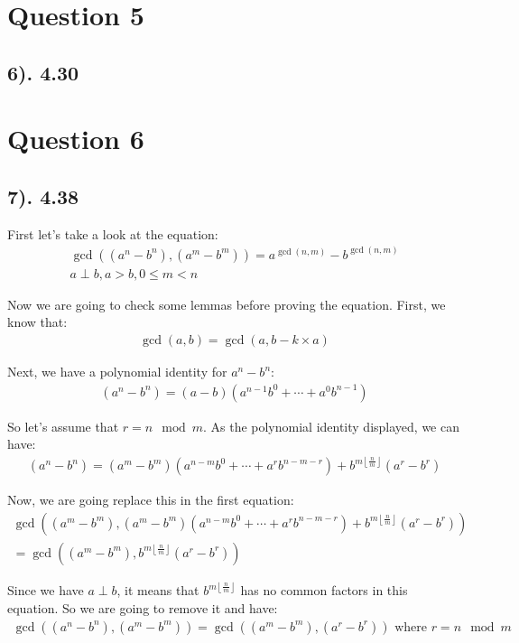 \documentclass[12pt]{article}
\begin{document}
\section*{Question 5}
\subsection*{6). 4.30}

\section*{Question 6}
\subsection*{7). 4.38}
First let's take a look at the equation:
\begin{gather*}
    \gcd((a^n - b^n), (a^m - b^m)) = a^{\gcd(n,m)} - b^{\gcd(n,m)} \\
    a \perp b, a > b, 0 \leq m < n
\end{gather*}

Now we are going to check some lemmas before proving the equation. First, we know that:
\begin{gather*}
    \gcd(a, b) = \gcd(a, b - k \times a)
\end{gather*}

Next, we have a polynomial identity for $a^n - b^n$:
\begin{gather*}
    (a^n - b^n) = (a - b)(a^{n-1}b^0 + \cdots + a^0b^{n-1})
\end{gather*}

So let's assume that $r = n \mod m$. As the polynomial identity displayed, we can have:
\begin{gather*}
    (a^n - b^n) = (a^m - b^m)(a^{n-m}b^0 + \cdots + a^r b^{n-m-r}) + b^{m \left\lfloor \frac{n}{m} \right\rfloor} (a^r - b^r)
\end{gather*}

Now, we are going replace this in the first equation:
\begin{gather*}
    \gcd((a^m - b^m), (a^m - b^m)(a^{n-m}b^0 + \cdots + a^r b^{n-m-r}) + b^{m \left\lfloor \frac{n}{m} \right\rfloor} (a^r - b^r)) \\
    = \gcd((a^m - b^m), b^{m \left\lfloor \frac{n}{m} \right\rfloor} (a^r - b^r))
\end{gather*}

Since we have $a \perp b$, it means that $b^{m \left\lfloor \frac{n}{m} \right\rfloor}$ has no common factors in this equation.
So we are going to remove it and have:
\begin{gather*}
    \gcd((a^n - b^n), (a^m - b^m)) = \gcd((a^m - b^m), (a^r - b^r)) \text{ where $r = n \mod m$}
\end{gather*}
\end{document}
